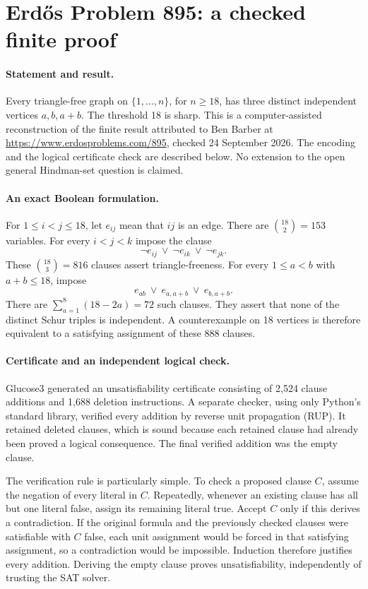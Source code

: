 \section*{Erd\H{o}s Problem 895: a checked finite proof}

\paragraph{Statement and result.}
Every triangle-free graph on \(\{1,\ldots,n\}\), for \(n\geq18\),
has three distinct independent vertices \(a,b,a+b\).
The threshold 18 is sharp. This is a computer-assisted
reconstruction of the finite result attributed to Ben Barber
at \url{https://www.erdosproblems.com/895}, checked
24 September 2026. The encoding and the logical certificate
check are described below. No extension to the open general
Hindman-set question is claimed.

\paragraph{An exact Boolean formulation.}
For \(1\leq i<j\leq18\), let \(e_{ij}\) mean that \(ij\)
is an edge. There are \(\binom{18}{2}=153\) variables.
For every \(i<j<k\) impose the clause
\[
 \neg e_{ij}\ \vee\ \neg e_{ik}\ \vee\ \neg e_{jk}.
\tag{1}
\]
These \(\binom{18}{3}=816\) clauses assert triangle-freeness.
For every \(1\leq a<b\) with \(a+b\leq18\), impose
\[
 e_{ab}\ \vee\ e_{a,a+b}\ \vee\ e_{b,a+b}.
\tag{2}
\]
There are \(\sum_{a=1}^8(18-2a)=72\) such clauses.
They assert that none of the distinct Schur triples is
independent. A counterexample on 18 vertices is therefore
equivalent to a satisfying assignment of these 888 clauses.

\paragraph{Certificate and an independent logical check.}
Glucose3 generated an unsatisfiability certificate consisting
of 2,524 clause additions and 1,688 deletion instructions.
A separate checker, using only Python's standard library,
verified every addition by reverse unit propagation (RUP).
It retained deleted clauses, which is sound because each
retained clause had already been proved a logical consequence.
The final verified addition was the empty clause.

The verification rule is particularly simple. To check a
proposed clause \(C\), assume the negation of every literal
in \(C\). Repeatedly, whenever an existing clause has all
but one literal false, assign its remaining literal true.
Accept \(C\) only if this derives a contradiction.
If the original formula and the previously checked clauses
were satisfiable with \(C\) false, each unit assignment
would be forced in that satisfying assignment, so a
contradiction would be impossible. Induction therefore
justifies every addition. Deriving the empty clause proves
unsatisfiability, independently of trusting the SAT solver.

